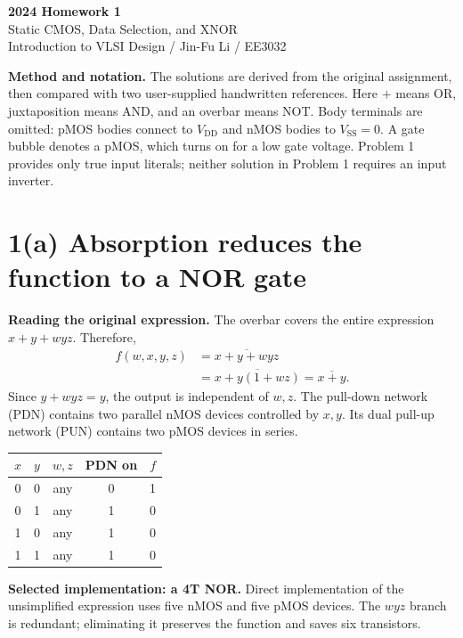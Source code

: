 \documentclass[11pt,a4paper]{article}
\newcommand{\answer}[1]{\par\noindent\colorbox{accent!9}{\parbox{0.96\linewidth}{#1}}\par}
\newcommand{\VDD}{V_{\mathrm{DD}}}
\newcommand{\VSS}{V_{\mathrm{SS}}}
\newcommand{\MOS}[5]{
  \coordinate (#1) at (#2,#3);
  \coordinate (#1t) at ($(#1)+(0,.55)$);
  \coordinate (#1b) at ($(#1)+(0,-.55)$);
  \draw (#1t)--($(#1)+(0,.30)$)--($(#1)+(-.18,.30)$);
  \draw ($(#1)+(-.18,.34)$)--($(#1)+(-.18,-.34)$);
  \draw ($(#1)+(-.18,-.30)$)--($(#1)+(0,-.30)$)--(#1b);
  \draw ($(#1)+(-.35,.33)$)--($(#1)+(-.35,-.33)$);
  \def\type{#5}\def\ptype{p}
  \ifx\type\ptype
    \draw ($(#1)+(-.78,0)$)--($(#1)+(-.53,0)$);
    \draw ($(#1)+(-.465,0)$) circle (.065);
    \draw ($(#1)+(-.40,0)$)--($(#1)+(-.35,0)$);
  \else
    \draw ($(#1)+(-.78,0)$)--($(#1)+(-.35,0)$);
  \fi
  \node[anchor=east] at ($(#1)+(-.82,0)$) {$#4$};
  \node[anchor=west,font=\scriptsize] at ($(#1)+(.10,0)$) {#1};
}
\begin{document}
\begin{center}
{\LARGE\bfseries 2024 Homework 1}\\[4pt]
{\large Static CMOS, Data Selection, and XNOR}\\[4pt]
{\small Introduction to VLSI Design / Jin-Fu Li / EE3032}
\end{center}
\textbf{Method and notation.} The solutions are derived from the original assignment,
then compared with two user-supplied handwritten references. Here $+$ means OR,
juxtaposition means AND, and an overbar means NOT. Body terminals are omitted:
pMOS bodies connect to $\VDD$ and nMOS bodies to $\VSS=0$. A gate bubble denotes
a pMOS, which turns on for a low gate voltage. Problem 1 provides only true input
literals; neither solution in Problem 1 requires an input inverter.

\section*{1(a) Absorption reduces the function to a NOR gate}
\textbf{Reading the original expression.} The overbar covers the entire expression
$x+y+w y z$. Therefore,
\begin{align*}
 f(w,x,y,z)&=\overline{x+y+w y z}\\
 &=\overline{x+y(1+wz)}=\boxed{\overline{x+y}}.
\end{align*}
Since $y+w y z=y$, the output is independent of $w,z$. The pull-down network
(PDN) contains two parallel nMOS devices controlled by $x,y$. Its dual pull-up
network (PUN) contains two pMOS devices in series.
\begin{center}
\end{center}
\begin{center}
\begin{tabular}{ccccc}\toprule
$x$&$y$&$w,z$&PDN on&$f$\\\midrule
0&0&any&0&1\\0&1&any&1&0\\1&0&any&1&0\\1&1&any&1&0\\\bottomrule
\end{tabular}
\end{center}
\answer{\textbf{Selected implementation: a 4T NOR.} Direct implementation of the
unsimplified expression uses five nMOS and five pMOS devices. The $wyz$ branch
is redundant; eliminating it preserves the function and saves six transistors.}
\end{document}
